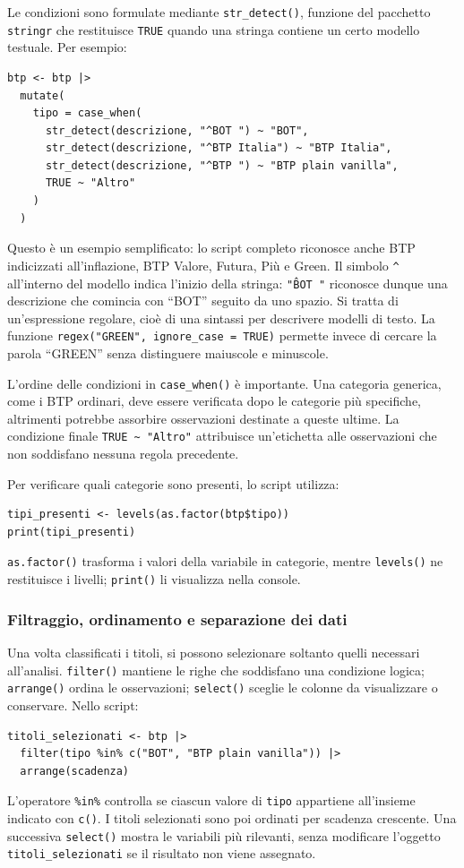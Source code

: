 Le condizioni sono formulate mediante \texttt{str\_detect()}, funzione del pacchetto \texttt{stringr} che restituisce \texttt{TRUE} quando una stringa contiene un certo modello testuale. Per esempio:
\begin{verbatim}
btp <- btp |>
  mutate(
    tipo = case_when(
      str_detect(descrizione, "^BOT ") ~ "BOT",
      str_detect(descrizione, "^BTP Italia") ~ "BTP Italia",
      str_detect(descrizione, "^BTP ") ~ "BTP plain vanilla",
      TRUE ~ "Altro"
    )
  )
\end{verbatim}
Questo è un esempio semplificato: lo script completo riconosce anche BTP indicizzati all'inflazione, BTP Valore, Futura, Più e Green. Il simbolo \texttt{\^} all'interno del modello indica l'inizio della stringa: \texttt{"\^BOT "} riconosce dunque una descrizione che comincia con ``BOT'' seguito da uno spazio. Si tratta di un'espressione regolare, cioè di una sintassi per descrivere modelli di testo. La funzione \texttt{regex("GREEN", ignore\_case = TRUE)} permette invece di cercare la parola ``GREEN'' senza distinguere maiuscole e minuscole.

L'ordine delle condizioni in \texttt{case\_when()} è importante. Una categoria generica, come i BTP ordinari, deve essere verificata dopo le categorie più specifiche, altrimenti potrebbe assorbire osservazioni destinate a queste ultime. La condizione finale \texttt{TRUE \textasciitilde{} "Altro"} attribuisce un'etichetta alle osservazioni che non soddisfano nessuna regola precedente.

Per verificare quali categorie sono presenti, lo script utilizza:
\begin{verbatim}
tipi_presenti <- levels(as.factor(btp$tipo))
print(tipi_presenti)
\end{verbatim}
\texttt{as.factor()} trasforma i valori della variabile in categorie, mentre \texttt{levels()} ne restituisce i livelli; \texttt{print()} li visualizza nella console.

\subsubsection{Filtraggio, ordinamento e separazione dei dati}

Una volta classificati i titoli, si possono selezionare soltanto quelli necessari all'analisi. \texttt{filter()} mantiene le righe che soddisfano una condizione logica; \texttt{arrange()} ordina le osservazioni; \texttt{select()} sceglie le colonne da visualizzare o conservare. Nello script:
\begin{verbatim}
titoli_selezionati <- btp |>
  filter(tipo %in% c("BOT", "BTP plain vanilla")) |>
  arrange(scadenza)
\end{verbatim}
L'operatore \texttt{\%in\%} controlla se ciascun valore di \texttt{tipo} appartiene all'insieme indicato con \texttt{c()}. I titoli selezionati sono poi ordinati per scadenza crescente. Una successiva \texttt{select()} mostra le variabili più rilevanti, senza modificare l'oggetto \texttt{titoli\_selezionati} se il risultato non viene assegnato.

